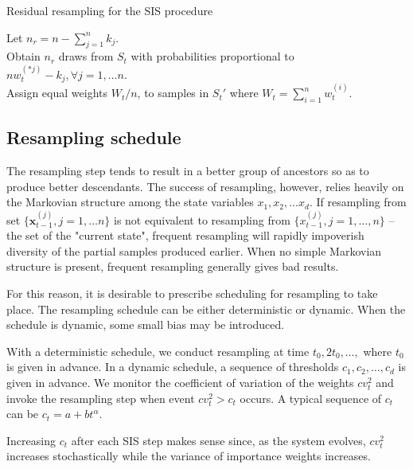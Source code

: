 \documentclass[times, utf8, diplomski]{fer}
\begin{document}
\begin{algorithm}
\caption{Residual resampling for the SIS procedure}
\label{ResS}
Let $n_r = n - \sum_{j = 1}^{n} k_j$.\\
Obtain $n_r$ draws from $S_t$ with probabilities proportional to $nw_t^{(*j)}- k_j, \forall j = 1, \ldots n$.\\
Assign equal weights $W_t / n$, to  samples in $S_t'$ where $W_t = \sum_{i = 1}^{n} w_t^{(i)}$.\\
\end{algorithm}

\subsection{Resampling schedule}
The resampling step tends to result in a better group of ancestors so  as to produce better descendants. The success of resampling, however, relies heavily on the Markovian structure among the state variables $x_1, x_2, \ldots x_d$. If resampling from set $\{ \mathbf{x}_{t - 1}^{(j)}, j = 1, \ldots n\}$ is not equivalent to resampling from $\{ x_{t - 1}^{(j)}, j = 1, \ldots, n\}$ -- the set of the "current state", frequent resampling will rapidly impoverish diversity of the partial samples produced earlier. When no simple Markovian structure is present, frequent resampling generally gives bad results.

For this reason, it is desirable to prescribe scheduling for resampling to take place. The resampling schedule can be either deterministic or dynamic. When the schedule is dynamic, some small bias may be introduced.

With a deterministic schedule, we conduct resampling at time $t_0, 2t_0, \ldots,$ where $t_0$ is given in advance. In a dynamic schedule, a sequence of thresholds $c_1, c_2, \ldots, c_d$ is given in advance. We monitor the coefficient of variation of the weights $cv_t^2$ and invoke the resampling step when event $cv_t^2 > c_t$ occurs. A typical sequence of $c_t$ can be $c_t = a + bt^\alpha$.

Increasing $c_t$ after each SIS step makes sense since, as the system evolves, $cv_t^2$ increases stochastically while the variance of importance weights increases. 
\end{document}
